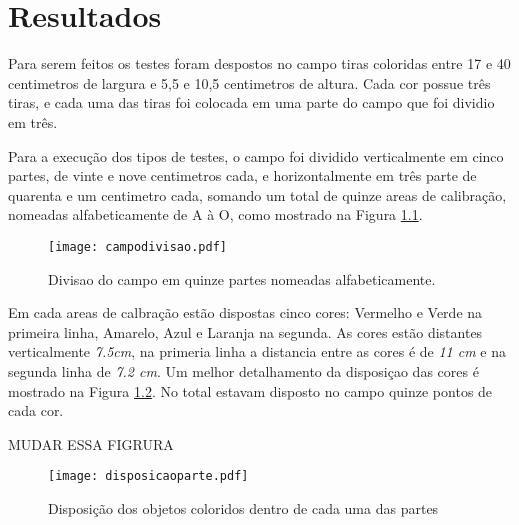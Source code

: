 \chapter{Resultados} 


	Para serem feitos os testes foram despostos no campo tiras coloridas entre 17 e 40 centimetros de largura e  5,5 e 10,5 centimetros de altura. Cada cor possue três tiras, e cada uma das tiras foi colocada em uma parte do campo que foi dividio em três.


Para a execução dos tipos de testes, o campo foi dividido verticalmente em cinco partes, de vinte e nove centimetros cada, e horizontalmente em três parte de quarenta e um centimetro cada, somando um total de quinze areas de calibração, nomeadas alfabeticamente de A à O, como mostrado na Figura \ref{campodivisao}.

\begin{figure}[!: h]
		\centering
		\texttt{[image: campodivisao.pdf]}
		\caption{Divisao do campo em quinze partes nomeadas alfabeticamente.}
		\label{campodivisao}
	\end{figure}
	
Em cada areas de calbração estão dispostas cinco cores: Vermelho  e Verde na primeira linha, Amarelo, Azul e Laranja na segunda. As cores estão distantes verticalmente \textit{7.5cm}, na primeria linha a distancia entre as cores é  de \textit{11 cm} e na segunda linha de \textit{7.2 cm}. Um  melhor detalhamento da disposiçao das cores é  mostrado na Figura \ref{disposicaoparte}. No total estavam disposto no campo quinze pontos de cada cor.


MUDAR ESSA FIGRURA
\begin{figure}[H]
		\centering
		\texttt{[image: disposicaoparte.pdf]}
		\caption{Disposição dos objetos coloridos dentro de cada uma das partes}
		\label{disposicaoparte}
	\end{figure}

